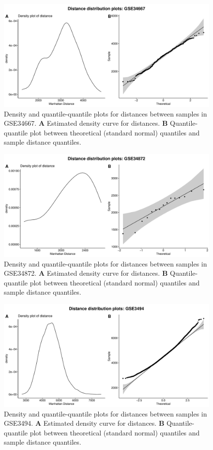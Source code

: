 \documentclass[10pt,letterpaper]{article}\usepackage[]{graphicx}\usepackage[]{color}
\begin{document}
\begin{figure}[H]
	\includegraphics[width=\textwidth]{manhattan-distance_hist_GSE34667.pdf}
	\caption{Density and quantile-quantile plots for distances between samples in GSE34667. \textbf{A} Estimated density curve for distances. \textbf{B} Quantile-quantile plot between theoretical (standard normal) quantiles and sample distance quantiles.}
\end{figure}

\begin{figure}[H]
	\includegraphics[width=\textwidth]{manhattan-distance_hist_GSE34872.pdf}
	\caption{Density and quantile-quantile plots for distances between samples in GSE34872. \textbf{A} Estimated density curve for distances. \textbf{B} Quantile-quantile plot between theoretical (standard normal) quantiles and sample distance quantiles.}
\end{figure}

\begin{figure}[H]
	\includegraphics[width=\textwidth]{manhattan-distance_hist_GSE3494.pdf}
	\caption{Density and quantile-quantile plots for distances between samples in GSE3494. \textbf{A} Estimated density curve for distances. \textbf{B} Quantile-quantile plot between theoretical (standard normal) quantiles and sample distance quantiles.}
\end{figure}
\end{document}
